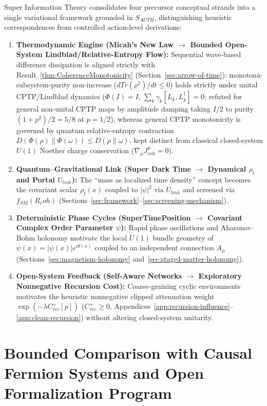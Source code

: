 \documentclass[american,11pt,letterpaper]{article}
\newcommand{\Rcoh}{R_{\mathrm{coh}}}
\def\mathrm#1{#1}%
\def\emph#1{#1}%
\def\Rcoh{R_coh}%
\begin{document}
Super Information Theory consolidates four precursor conceptual strands into a single variational framework grounded in $S_{\mathrm{AUTH}}$, distinguishing heuristic correspondences from controlled action-level derivations:
\begin{enumerate}[leftmargin=2em]
  \item \textbf{Thermodynamic Engine (\emph{Micah's New Law} $\to$ Bounded Open-System Lindblad/Relative-Entropy Flow):} Sequential wave-based difference dissipation is aligned strictly with Result~\ref{thm:CoherenceMonotonicity} (Section~\ref{sec:arrow-of-time}): monotonic subsystem-purity non-increase ($d\mathrm{Tr}(\rho^2)/dt \le 0$) holds strictly under \emph{unital} CPTP/Lindblad dynamics ($\Phi(I) = I$, $\sum_k \gamma_k [L_k, L_k^\dagger] = 0$; refuted for general non-unital CPTP maps by amplitude damping taking $I/2$ to purity $(1+p^2)/2 = 5/8$ at $p = 1/2$), whereas \emph{general} CPTP monotonicity is governed by quantum relative-entropy contraction $D(\Phi(\rho)\|\Phi(\omega)) \le D(\rho\|\omega)$, kept distinct from classical closed-system $U(1)$ Noether charge conservation ($\nabla_\mu J^\mu_{\mathrm{coh}} = 0$).
  \item \textbf{Quantum--Gravitational Link (\emph{Super Dark Time} $\to$ Dynamical $\rho_t$ and Portal $U_{\mathrm{link}}$):} The ``mass as localized time density'' concept becomes the covariant scalar $\rho_t(x)$ coupled to $|\psi|^2$ via $U_{\mathrm{link}}$ and screened via $f_{\mathrm{SM}}(\Rcoh)$ (Sections~\ref{sec:framework}--\ref{sec:screening-mechanism}).
  \item \textbf{Deterministic Phase Cycles (\emph{SuperTimePosition} $\to$ Covariant Complex Order Parameter $\psi$):} Rapid phase oscillations and Aharonov--Bohm holonomy motivate the local $U(1)$ bundle geometry of $\psi(x) = |\psi(x)|e^{i\theta(x)}$ coupled to an independent connection $A_\mu$ (Sections~\ref{sec:magnetism-holonomy} and~\ref{sec:stage4-matter-holonomy}).
  \item \textbf{Open-System Feedback (\emph{Self-Aware Networks} $\to$ Exploratory Nonnegative Recursion Cost):} Coarse-graining cyclic environments motivates the heuristic nonnegative clipped attenuation weight $\exp(-\lambda C_{\mathrm{rec}}^+[p])$ ($C_{\mathrm{rec}}^+ \ge 0$, Appendices~\ref{app:recursion-influence}--\ref{app:clean-recursion}) without altering closed-system unitarity.
\end{enumerate}

\section{Bounded Comparison with Causal Fermion Systems and Open Formalization Program}
\label{app:chronology}
\end{document}
